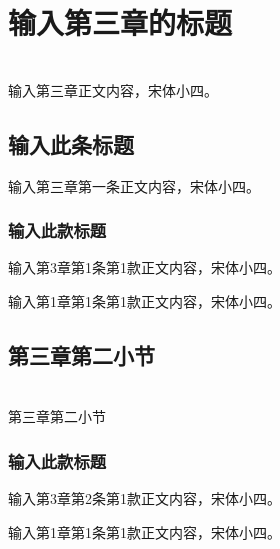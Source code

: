 
\newpage
\section{输入第三章的标题} %

~\\
    
    \song{}
    输入第三章正文内容，宋体小四。  


    \subsection{输入此条标题} %

        输入第三章第一条正文内容，宋体小四。

        \subsubsection{输入此款标题} %

            输入第3章第1条第1款正文内容，宋体小四。


                输入第1章第1条第1款正文内容，宋体小四。




\subsection{第三章第二小节} %

~\\
    
    第三章第二小节

    \subsubsection{输入此款标题} %

        输入第3章第2条第1款正文内容，宋体小四。


            输入第1章第1条第1款正文内容，宋体小四。







